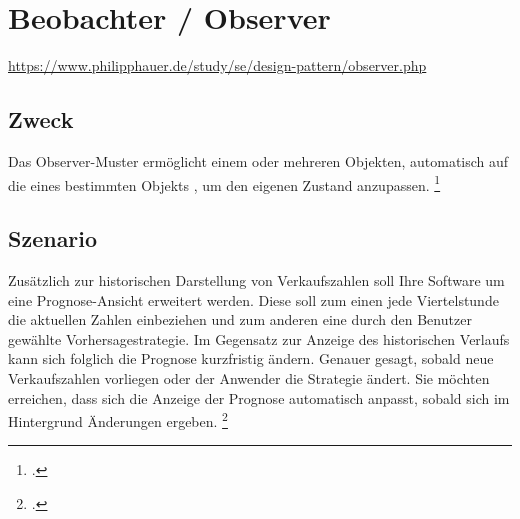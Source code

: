 \documentclass{lehramt-informatik}
\begin{document}

\chapter{Beobachter / Observer}

\begin{quellen}
\item \cite{wiki:beobachter}
\item \url{https://www.philipphauer.de/study/se/design-pattern/observer.php}
\item \cite[Seite 249-257]{gof}
\item \cite[Kapitel 8.5.1, Seite 269-274]{schatten}
\item \cite[Kapitel 4.7, Seite 70-75]{eilebrecht}
\item \cite[Seite 269]{siebler}
\end{quellen}

%

\section{Zweck}

Das Observer-Muster ermöglicht einem oder mehreren Objekten, automatisch
auf die  eines bestimmten Objekts , um den eigenen Zustand anzupassen.
\footcite[Seite 70]{eilebrecht}

%

\section{Szenario}

Zusätzlich zur historischen Darstellung von Verkaufszahlen soll Ihre
Software um eine Prognose-Ansicht erweitert werden. Diese soll zum einen
jede Viertelstunde die aktuellen Zahlen einbeziehen und zum anderen eine
durch den Benutzer gewählte Vorhersagestrategie. Im Gegensatz zur
Anzeige des historischen Verlaufs kann sich folglich die Prognose
kurzfristig ändern. Genauer gesagt, sobald neue Verkaufszahlen vorliegen
oder der Anwender die Strategie ändert. Sie möchten erreichen, dass sich
die Anzeige der Prognose automatisch anpasst, sobald sich im Hintergrund
Änderungen ergeben.
\footcite[Seite 70]{eilebrecht}
\end{document}
